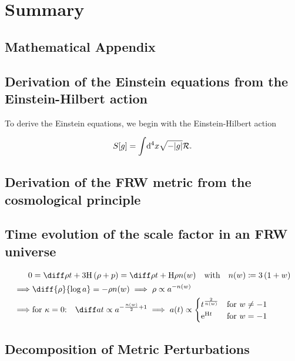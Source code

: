 \documentclass[parskip=half]{scrreprt}
\begin{document}
\chapter{Summary}


\begin{appendices}

\chapter{Mathematical Appendix}

\section{Derivation of the Einstein equations from the Einstein-Hilbert action}\label{app:deriv_einstein_eqns}

To derive the Einstein equations, we begin with the Einstein-Hilbert action

\begin{align}
	S[g] = \int \! \dif{^4x} \sqrt{-|g|} \Rscal \eqpunct{.}
\end{align}


\section{Derivation of the FRW metric from the cosmological principle}\label{app:deriv_frw}

\section{Time evolution of the scale factor in an FRW universe}\label{app:deriv_frw_a_evol}

\begin{align}
	0 &= \dt{\rho} + 3\Hcosm\del{\rho + p} = \dt{\rho} + \Hcosm\rho \nexp \quad \text{with} \quad \nexp \defeq 3\del{1 + \eosp} \\
	\implies &\diff{\rho}{\efold} = -\rho\nexp \implies \rho \propto a^{-\nexp} \\
	\implies &\text{for \(\spatcurv=0\):} \quad \dt{a} \propto a^{-\frac{\nexp}{2}+1} \implies a(t) \propto
	\begin{cases}
		t^{\frac{2}{\nexp}} &\text{for \(\eosp\neq-1\)} \\
		\eul^{\Hcosm t} &\text{for \(\eosp=-1\)}
	\end{cases}
\end{align}


\section{Decomposition of Metric Perturbations}\label{app:deriv_decompose}


\end{appendices}
\end{document}
